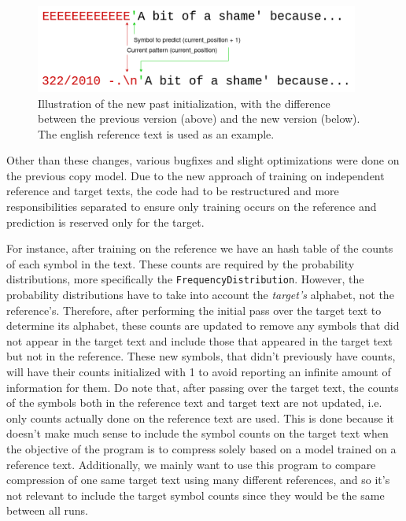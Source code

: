 \documentclass{article}
\begin{document}
\begin{figure}
    \centering
    \includegraphics[width=0.95\textwidth]{./images/lang_new_past.png}
    \caption{Illustration of the new past initialization, with the difference between the previous version (above) and the new version (below). The english reference text is used as an example.}
    \label{fig:lang_new_past}
\end{figure}

Other than these changes, various bugfixes and slight optimizations were done on the previous copy model.
Due to the new approach of training on independent reference and target texts, the code had to be restructured and more responsibilities separated to ensure only training occurs on the reference and prediction is reserved only for the target.

For instance, after training on the reference we have an hash table of the counts of each symbol in the text.
These counts are required by the probability distributions, more specifically the \verb|FrequencyDistribution|.
However, the probability distributions have to take into account the \emph{target's} alphabet, not the reference's.
Therefore, after performing the initial pass over the target text to determine its alphabet, these counts are updated to remove any symbols that did not appear in the target text and include those that appeared in the target text but not in the reference.
These new symbols, that didn't previously have counts, will have their counts initialized with 1 to avoid reporting an infinite amount of information for them.
Do note that, after passing over the target text, the counts of the symbols both in the reference text and target text are not updated, i.e. only counts actually done on the reference text are used.
This is done because it doesn't make much sense to include the symbol counts on the target text when the objective of the program is to compress solely based on a model trained on a reference text.
Additionally, we mainly want to use this program to compare compression of one same target text using many different references, and so it's not relevant to include the target symbol counts since they would be the same between all runs.
\end{document}

